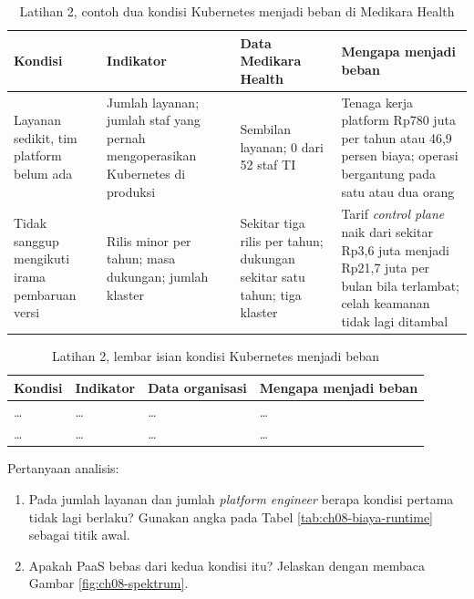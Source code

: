 \begin{table}[!htb]
  \centering
  \caption{Latihan 2, contoh dua kondisi Kubernetes menjadi beban di Medikara Health}
  \label{tab:ch08-lat2-contoh}
  \footnotesize
  \begin{tabularx}{\textwidth}{>{\raggedright\arraybackslash}p{2.4cm}
      >{\raggedright\arraybackslash}X >{\raggedright\arraybackslash}X
      >{\raggedright\arraybackslash}X}
    \hline
    \textbf{Kondisi} & \textbf{Indikator} & \textbf{Data Medikara Health} & \textbf{Mengapa menjadi
      beban} \\ \hline
    Layanan sedikit, tim platform belum ada & Jumlah layanan; jumlah staf yang pernah
      mengoperasikan Kubernetes di produksi & Sembilan layanan; 0 dari 52 staf TI & Tenaga kerja
      platform Rp780 juta per tahun atau 46,9 persen biaya; operasi bergantung pada satu atau dua
      orang \\ \hline
    Tidak sanggup mengikuti irama pembaruan versi & Rilis minor per tahun; masa dukungan; jumlah
      klaster & Sekitar tiga rilis per tahun; dukungan sekitar satu tahun; tiga klaster & Tarif
      \textit{control plane} naik dari sekitar Rp3,6 juta menjadi Rp21,7 juta per bulan bila
      terlambat; celah keamanan tidak lagi ditambal \\ \hline
  \end{tabularx}
\end{table}

\begin{table}[!htb]
  \centering
  \caption{Latihan 2, lembar isian kondisi Kubernetes menjadi beban}
  \label{tab:ch08-lat2-hasil}
  \footnotesize
  \begin{tabularx}{\textwidth}{>{\raggedright\arraybackslash}p{2.4cm}
      >{\raggedright\arraybackslash}X >{\raggedright\arraybackslash}X
      >{\raggedright\arraybackslash}X}
    \hline
    \textbf{Kondisi} & \textbf{Indikator} & \textbf{Data organisasi} & \textbf{Mengapa menjadi
      beban} \\ \hline
    \dots & \dots & \dots & \dots \\ \hline
    \dots & \dots & \dots & \dots \\ \hline
  \end{tabularx}
\end{table}

Pertanyaan analisis:
\begin{enumerate}
  \item Pada jumlah layanan dan jumlah \textit{platform engineer} berapa kondisi pertama tidak
        lagi berlaku? Gunakan angka pada Tabel \ref{tab:ch08-biaya-runtime} sebagai titik awal.
  \item Apakah PaaS bebas dari kedua kondisi itu? Jelaskan dengan membaca Gambar
        \ref{fig:ch08-spektrum}.
\end{enumerate}

